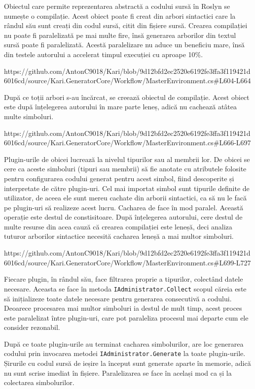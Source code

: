 \documentclass[a4paper,12pt]{report}
\begin{document}
Obiectul care permite reprezentarea abstractă a codului sursă în Roslyn se numește o compilație.
Acest obiect poate fi creat din arbori sintactici care la rândul său sunt creați din codul sursă, citit din fișiere sursă.
Crearea compilației nu poate fi paralelizată pe mai multe fire, însă generarea arborilor din textul sursă poate fi paralelizată.
Acestă paralelizare nu aduce un beneficiu mare, însă din testele autorului a accelerat timpul execuției cu aproape 10\%.

https://github.com/AntonC9018/Kari/blob/9d12bfd2ec2520e6192fe3ffa3f119421d6016cd/source/Kari.GeneratorCore/Workflow/MasterEnvironment.cs#L604-L664

După ce toții arbori s-au încărcat, se creează obiectul de compilație.
Acest obiect este după înțelegerea autorului în mare parte leneș, adică nu cachează atâtea multe simboluri.

https://github.com/AntonC9018/Kari/blob/9d12bfd2ec2520e6192fe3ffa3f119421d6016cd/source/Kari.GeneratorCore/Workflow/MasterEnvironment.cs#L666-L697

Plugin-urile de obicei lucrează la nivelul tipurilor sau al membrii lor.
De obicei se cere ca aceste simboluri (tipuri sau membrii) să fie anotate cu atributele folosite pentru configurarea codului generat pentru acest simbol, fiind descoperite și interpretate de către plugin-uri.
Cel mai importat simbol sunt tipurile definite de utilizator, de aceea ele sunt mereu cachate din arborii sintactici, ca să nu le facă pe plugin-uri să realizeze acest lucru.
Cacharea de face în mod paralel.
Această operație este destul de constisitoare.
După înțelegerea autorului, cere destul de multe resurse din acea cauză că crearea compilației este leneșă, deci analiza tuturor arborilor sintactice necesită cacharea leneșă a mai multor simboluri.

https://github.com/AntonC9018/Kari/blob/9d12bfd2ec2520e6192fe3ffa3f119421d6016cd/source/Kari.GeneratorCore/Workflow/MasterEnvironment.cs#L699-L727

Fiecare plugin, în rândul său, face filtrarea proprie a tipurilor, colectând datele necesare.
Aceasta se face în metoda \texttt{IAdministrator.Collect} scopul căreia este să inițializeze toate datele necesare pentru generarea consecutivă a codului.
Deoarece procesarea mai multor simboluri ia destul de mult timp, acest proces este paralelizat între plugin-uri, care pot paraleliza procesul mai departe cum ele consider rezonabil.

După ce toate plugin-urile au terminat cacharea simbolurilor, are loc generarea codului prin invocarea metodei \texttt{IAdministrator.Generate} la toate plugin-urile.
Șirurile cu codul sursă de ieșire la început sunt generate aparte în memorie, adică nu sunt scrise imediat în fișiere.
Paralelizarea se face în același mod ca și la colectarea simbolurilor.
\end{document}
